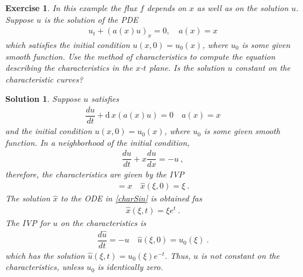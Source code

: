 \documentclass[10pt,letterpaper]{article}
\newcommand{\dif}[1][]{\mathrm{d} {#1}\,}
\newcommand{\rb}[1]{ \left(  {#1} \right) }
\newcommand{\frb}[1]{ \left(  {#1} \right) }
\theoremstyle{break}
\newtheorem{exercise}{Exercise}
\newtheorem{mysolution}{Solution}
\newenvironment{solution}{\begin{mysolution}}{\end{mysolution}}
\begin{document}
\begin{exercise}
	In this example the flux $f$ depends on $x$ as well as on the solution $u$.
	Suppose $u$ is the solution of the PDE
	\begin{gather}%
		u_t +\rb{a(x)u}_x=0,
		\quad
		a(x)= x
	\end{gather}%
	which satisfies the initial condition $u(x,0)=u_0(x)$, where $u_0$ is some given smooth function.
	Use the method of characteristics to compute the equation describing the characteristics in the $x$-$t$ plane.
	Is the solution $u$ constant on the characteristic curves?
\end{exercise}

\begin{solution}
	Suppose $u$ satisfies
	\begin{gather}
		\dfrac{du}{dt}+\dif{}{x}\rb{a(x)u}=0
		\quad
		a(x)=x
	\end{gather}
	and the initial condition $u(x,0)=u_0(x)$, where $u_0$ is some given smooth function.
	In a neighborhood of the initial condition,
	\begin{gather}
		\dfrac{du}{dt}+x \dfrac{du}{dx}=-u\ ,
	\end{gather}
	therefore, the characteristics are given by the IVP
	\begin{gather} \label{charSin}
		=x
		\quad
		\hat x\frb{\xi,0}=\xi\ .
	\end{gather}
	The solution $\hat x$ to the ODE in \eqref{charSin} is obtained fas
	\begin{gather}
		\hat x\frb{\xi,t}=\xi e^t\ .
	\end{gather}
	The IVP for $u$ on the characteristics is
	\begin{gather}
		\dfrac{d\hat u}{dt}=-u
		\quad
		\hat u\frb{\xi,0}=u_0\frb{\xi}\ .
	\end{gather}
	which has the solution $\hat u(\xi,t) = u_0(\xi) e^{-t}$. Thus, $u$ is not constant on the characteristics, unless $u_0$ is identically zero.	
\end{solution}
\end{document}
